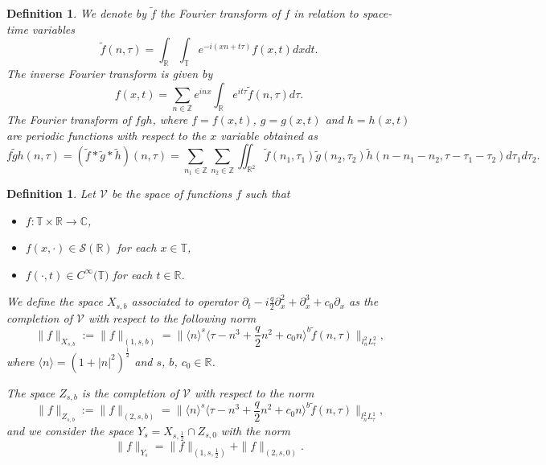 \documentclass[reqno]{amsart}
\newtheorem{definition}[theorem]{Definition}
\numberwithin{equation}{section}
\begin{document}
\begin{definition}
We denote by $\widetilde{f}$ the Fourier transform of $f$ in
relation to space-time variables
\[
\widetilde{f}(n,\tau)=
{\displaystyle\int\nolimits_{\mathbb{R}}}
\int_{\mathbb{T}}e^{-i(xn+t\tau)}f(x,t)dxdt\text{.}\]
The inverse Fourier transform is given by
\[
f(x,t)=\sum\limits_{n\in\mathbb{Z}}e^{inx}
{\displaystyle\int\nolimits_{\mathbb{R}}}
e^{it\tau}\widetilde{f}(n,\tau)d\tau\text{.}\]
The Fourier transform of $fgh$, where $f=f(x,t)$, $g=g(x,t)$ and
$h=h(x,t)$ are periodic functions with respect to  the $x$ variable obtained as
\[
\widetilde{fgh}(n,\tau)\!=\!(\widetilde{f}\ast\widetilde{g}\ast\widetilde{h})(n,\tau)
\!=\!\sum_{n_{1}\in\mathbb{Z}}\sum_{n_{2}\in\mathbb{Z}}\iint\nolimits_{\mathbb{R}
^{2}}\widetilde{f}(n_{1},\tau_{1})\widetilde{g}(n_{2},\tau_{2})\widetilde
{h}(n-n_{1}-n_{2},\tau-\tau_{1}-\tau_{2})d\tau_{1}d\tau_{2}\text{.}
\]

\end{definition}

\begin{definition}
Let $\mathcal{V}$ be the space of functions $f$ such that
\begin{itemize}
\item[(i)]  $f:\mathbb{T}\times\mathbb{R}\rightarrow\mathbb{C}$,
\item[(ii)]  $f(x,\cdot)\in\mathcal{S}(\mathbb{R})$ for each $x\in\mathbb{T}$,
\item[(iii)]  $f(\cdot,t)\in C^{\infty}(\mathbb{T)}$ for each $t\in\mathbb{R}$.
\end{itemize}
We define the space $X_{s,b}$ associated to operator
$\partial_{t}-i\frac{q}{2}
\partial_{x}^{2}+\partial_{x}^{3}+c_{0}\partial_{x}$ as the completion of $\mathcal{V}$
with respect to the following norm\[
\| f\| _{X_{s,b}}:=\| f\| _{(1,s,b)}=\| \langle
n\rangle^{s}\langle
\tau-n^{3}+\frac{q}{2}n^{2}+c_{0}n\rangle^{b}\widetilde{f}(n,\tau)\|
_{l_{n}^{2}L_{\tau}^{2}}\text{,}
\]
where $\langle n\rangle=(1+|n|^{2})^{\frac{1}{2}}$ and $s$, $b$, $c_{0}\in\mathbb{R}$.

The space $Z_{s,b}$ is the completion of $\mathcal{V}$ with respect to the norm
\[
\| f\| _{Z_{s,b}}:=\| f\| _{(2,s,b)}=\| \langle
n\rangle^{s}\langle
\tau-n^{3}+\frac{q}{2}n^{2}+c_{0}n\rangle^{b}\widetilde{f}(n,\tau)\|
_{l_{n}^{2}L_{\tau}^{1}}\text{,}
\]
and we consider the space $Y_{s}=X_{s,\frac12}\cap Z_{s,0}$ with the norm
\[
\| f\| _{Y_{s}}=\| f\| _{(1,s,\frac12
)}+\| f\| _{(2,s,0)}\text{.}
\]
\end{definition}
\end{document}
